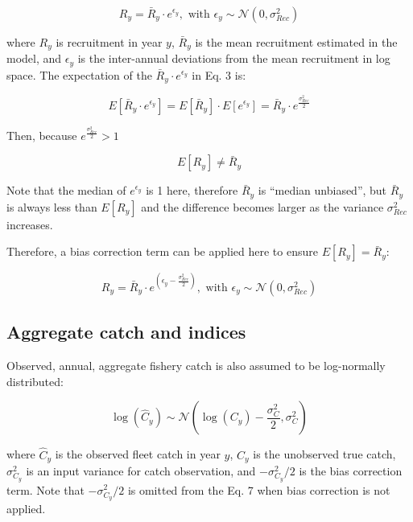 \documentclass[
  12pt,
]{article}
\begin{document}
\begin{equation}
R_{y} = \bar{R}_{y} \cdot e^{\epsilon_{y}}, \text{ with } \epsilon_y \sim \mathcal{N}(0, \sigma_{Rec}^2)
\end{equation}

where \(R_{y}\) is recruitment in year \(y\), \(\bar{R}_{y}\) is the
mean recruitment estimated in the model, and \(\epsilon_{y}\) is the
inter-annual deviations from the mean recruitment in log space. The
expectation of the \(\bar{R}_{y} \cdot e^{\epsilon_{y}}\) in Eq. 3 is:

\begin{equation}
E[\bar{R}_{y} \cdot e^{\epsilon_{y}}] = E[\bar{R}_{y}] \cdot E[e^{\epsilon_{y}}] =
\bar{R}_{y} \cdot e^\frac{\sigma_{Rec}^2}{2}
\end{equation}

Then, because \(e^\frac{\sigma_{Rec}^2}{2} > 1\)

\begin{equation}
E[R_{y}] \neq \bar{R}_{y}
\end{equation}

Note that the median of \(e^{\epsilon_{y}}\) is 1 here, therefore
\(\bar{R}_{y}\) is ``median unbiased'', but \(\bar{R}_{y}\) is always
less than \(E[R_{y}]\) and the difference becomes larger as the variance
\(\sigma_{Rec}^2\) increases.

Therefore, a bias correction term can be applied here to ensure
\(E[R_{y}] = \bar{R}_{y}\):

\begin{equation}
R_{y} = \bar{R}_{y} \cdot e^{\left(\epsilon_{y} - \frac{\sigma_{Rec}^2}{2}\right)}, \text{ with } \epsilon_y \sim \mathcal{N}(0, \sigma_{Rec}^2)
\end{equation}

\subsection{Aggregate catch and
indices}\label{aggregate-catch-and-indices}

Observed, annual, aggregate fishery catch is also assumed to be
log-normally distributed:

\begin{equation}
\log(\hat{C}_{y}) \sim \mathcal{N} \left( \log(C_{y}) - \frac{\sigma^2_{C}}{2}, \sigma^2_{C} \right)
\end{equation}

where \(\hat{C}_{y}\) is the observed fleet catch in year \(y\),
\({C}_{y}\) is the unobserved true catch, \(\sigma^2_{C_{y}}\) is an
input variance for catch observation, and \(-\sigma^2_{C_{y}}/2\) is the
bias correction term. Note that \(-\sigma^2_{C_{y}}/2\) is omitted from
the Eq. 7 when bias correction is not applied.
\end{document}

